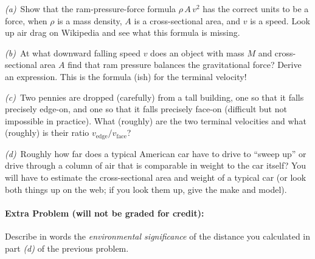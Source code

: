 \documentclass[12pt]{article}
\begin{document}
\textsl{(a)}~Show that the ram-pressure-force formula $\rho\,A\,v^2$ has the
correct units to be a force, when $\rho$ is a mass density, $A$ is a
cross-sectional area, and $v$ is a speed. Look up air drag on
Wikipedia and see what this formula is missing.

\textsl{(b)}~At what downward falling speed $v$ does an object with
mass $M$ and cross-sectional area $A$ find that ram pressure balances
the gravitational force? Derive an expression. This is the formula
(ish) for the terminal velocity!

\textsl{(c)}~Two pennies are dropped (carefully) from a tall building,
one so that it falls precisely edge-on, and one so that it falls
precisely face-on (difficult but not impossible in practice).  What
(roughly) are the two terminal velocities and what (roughly) is
their ratio $v_{\mathrm{edge}}/v_{\mathrm{face}}$?

\textsl{(d)}~Roughly how far does a typical American car have to drive
to ``sweep up'' or drive through a column of air that is comparable in
weight to the car itself?  You will have to estimate the
cross-sectional area and weight of a typical car (or look both things
up on the web; if you look them up, give the make and model).

\paragraph{Extra Problem (will not be graded for credit):}%
Describe in words the \emph{environmental significance} of the
distance you calculated in part \textsl{(d)} of the previous problem.
\end{document}
